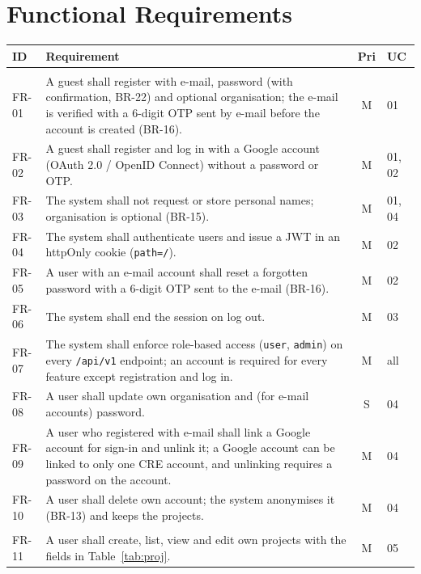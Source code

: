 \documentclass[11pt,a4paper]{article}
\begin{document}
\section{Functional Requirements}
\begin{longtable}{@{}l R{11.2cm} c l@{}}
\toprule
{}ID & Requirement & Pri & UC \\
\midrule
\endhead
{}\\
FR-01 & A guest shall register with e-mail, password (with confirmation, BR-22) and optional organisation; the e-mail is verified with a 6-digit OTP sent by e-mail before the account is created (BR-16). & M & 01 \\
FR-02 & A guest shall register and log in with a Google account (OAuth 2.0 / OpenID Connect) without a password or OTP. & M & 01, 02 \\
FR-03 & The system shall not request or store personal names; organisation is optional (BR-15). & M & 01, 04 \\
FR-04 & The system shall authenticate users and issue a JWT in an httpOnly cookie (\texttt{path=/}). & M & 02 \\
FR-05 & A user with an e-mail account shall reset a forgotten password with a 6-digit OTP sent to the e-mail (BR-16). & M & 02 \\
FR-06 & The system shall end the session on log out. & M & 03 \\
FR-07 & The system shall enforce role-based access (\texttt{user}, \texttt{admin}) on every \texttt{/api/v1} endpoint; an account is required for every feature except registration and log in. & M & all \\
FR-08 & A user shall update own organisation and (for e-mail accounts) password. & S & 04 \\
FR-09 & A user who registered with e-mail shall link a Google account for sign-in and unlink it; a Google account can be linked to only one CRE account, and unlinking requires a password on the account. & M & 04 \\
FR-10 & A user shall delete own account; the system anonymises it (BR-13) and keeps the projects. & M & 04 \\
\\
FR-11 & A user shall create, list, view and edit own projects with the fields in Table~\ref{tab:proj}. & M & 05 \\

\end{longtable}
\end{document}
